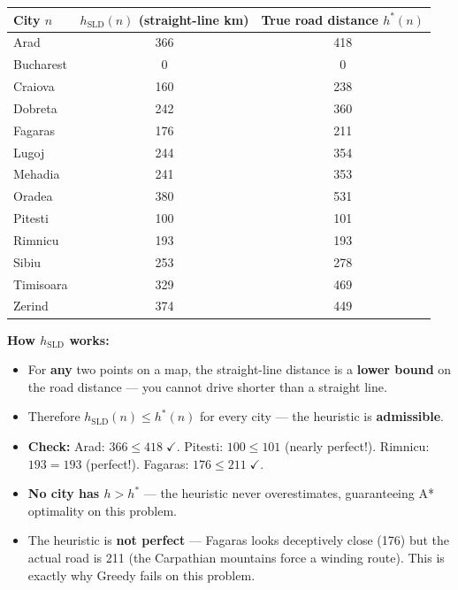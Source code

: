 \documentclass[12pt, a4paper]{article}
\begin{document}
\vspace{0.4em}

\begin{center}
\renewcommand{\arraystretch}{1.15}
\small
\begin{tabular}{l|c|c}
\toprule
\textbf{City $n$} & $h_{\text{SLD}}(n)$ (straight-line km) & True road distance $h^*(n)$ \\
\midrule
Arad      & 366 & 418 \\
Bucharest & 0   & 0   \\
Craiova   & 160 & 238 \\
Dobreta   & 242 & 360 \\
Fagaras   & 176 & 211 \\
Lugoj     & 244 & 354 \\
Mehadia   & 241 & 353 \\
Oradea    & 380 & 531 \\
Pitesti   & 100 & 101 \\
Rimnicu   & 193 & 193 \\
Sibiu     & 253 & 278 \\
Timisoara & 329 & 469 \\
Zerind    & 374 & 449 \\
\bottomrule
\end{tabular}
\end{center}

\vspace{0.4em}

\noindent\textbf{How $h_{\text{SLD}}$ works:}
\begin{itemize}[leftmargin=1.5cm, itemsep=2pt, topsep=3pt]
  \item For \textbf{any} two points on a map, the straight-line distance is a \textbf{lower bound} on the road distance — you cannot drive shorter than a straight line.
  \item Therefore $h_{\text{SLD}}(n) \leq h^*(n)$ for every city — the heuristic is \textbf{admissible}.
  \item \textbf{Check:} Arad: $366 \leq 418 \;\checkmark$. Pitesti: $100 \leq 101$ (nearly perfect!). Rimnicu: $193 = 193$ (perfect!). Fagaras: $176 \leq 211 \;\checkmark$.
  \item \textbf{No city has $h > h^*$} — the heuristic never overestimates, guaranteeing A* optimality on this problem.
  \item The heuristic is \textbf{not perfect} — Fagaras looks deceptively close (176) but the actual road is 211 (the Carpathian mountains force a winding route). This is exactly why Greedy fails on this problem.
\end{itemize}
\end{document}
